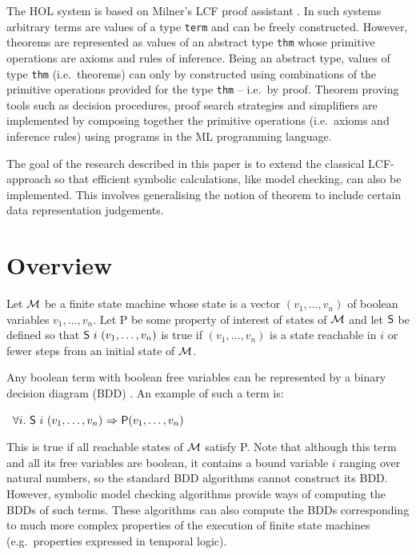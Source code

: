 \documentclass[12pt]{article}
\newcommand{\tyind}[1]{\index[MLty]{#1}}
\newcommand{\con}[1]{\mbox{\sf #1}}
\newcommand{\ty}[1]{\mbox{\tt #1}}
\newcommand{\ml}[1]{{\tt #1}}
\newcommand\HOL{HOL\xspace}
\newcommand\imp{{\Rightarrow}}
\begin{document}
The \HOL{} system is based on Milner's LCF proof assistant
\cite{EdinLCF}.  In such systems arbitrary terms are values of a type
\ty{term}\tyind{\ml{term}} and can be freely constructed. However, theorems are
represented as values of an abstract type \ty{thm}\tyind{\ml{thm}} whose primitive
operations are axioms and rules of inference.  Being an abstract type,
values of type \ty{thm} (i.e.~theorems) can only by constructed using
combinations of the primitive operations provided for the type
\ty{thm} -- i.e.~by proof.  Theorem proving tools such as decision
procedures, proof search strategies and simplifiers are implemented by
composing together the primitive operations (i.e.~axioms and inference
rules) using programs in the ML programming language.

The goal of the research described in this paper is to extend the
classical LCF-approach so that efficient symbolic calculations, like
model checking, can also be implemented. This involves generalising
the notion of theorem to include certain data representation
judgements.






\section{Overview}

Let ${\cal M}$ be a finite state machine whose state is a vector
$(v_1,\ldots,v_n)$ of boolean variables
$v_1,\ldots,v_n$.
Let
\con{P} be some property of interest  of states of  ${\cal M}$ and
let $\con{S}$ be defined so that
$\con{S}~i~(v_1,\ldots,v_n)$ is true if $(v_1,\ldots,v_n)$ is a state
reachable in $i$ or fewer steps from an initial state of ${\cal M}$.

Any boolean term with boolean free variables
can be represented by a binary
decision diagram (BDD) \cite{BryantSurvey}. An example of such a term is:

\smallskip

~$\forall i.~\con{S}~i~(v_1,\ldots,v_n)~\imp~\con{P}(v_1,\ldots,v_n)$

\smallskip

This is true if all
reachable states of ${\cal M}$ satisfy \con{P}. Note that although this
term and all its free variables are boolean, it contains a bound
variable $i$ ranging over natural numbers, so the standard BDD
algorithms cannot construct its BDD. However, 
symbolic model checking algorithms provide ways of computing the BDDs
of such terms. These algorithms can also
compute the BDDs corresponding to much more complex properties of the
execution of finite state machines (e.g.~properties expressed in
temporal logic).
\end{document}
